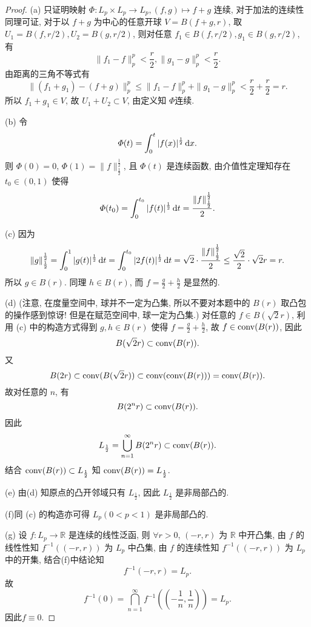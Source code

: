 \begin{proof}
    (a) 只证明映射 $\varPhi:L_p\times L_p\to L_p,(f,g)\mapsto f+g$ 连续,
    对于加法的连续性同理可证, 对于以 $f+g$ 为中心的任意开球 $V=B(f+g,r)$,
    取 $U_1=B(f,r/2),U_2=B(g,r/2)$, 则对任意 $f_1\in B(f,r/2),g_1\in B(g,r/2)$, 有
    \[\|f_1-f\|_p^p<\frac{r}{2},\|g_1-g\|_p^p<\frac{r}{2}.\]
    由距离的三角不等式有
    \[\|(f_1+g_1)-(f+g)\|_p^p\leq\|f_1-f\|_p^p+\|g_1-g\|_p^p<\frac{r}{2}+\frac{r}{2}=r.\]
    所以 $f_1+g_1\in V$, 故 $U_1+U_2\subset V$, 由定义知 $\varPhi$连续.

    (b) 令
    \[\varPhi(t)=\int_0^t|f(x)|^{\frac{1}{2}}\mathop{}\!\mathrm{d} x.\]
    则 $\varPhi(0)=0$, $\varPhi(1)=\|f\|_{\frac{1}{2}}^{\frac{1}{2}}$,
    且 $\varPhi(t)$ 是连续函数, 由介值性定理知存在 $t_0\in(0,1)$ 使得
    \[\varPhi(t_0)=\int_0^{t_0}|f(t)|^{\frac{1}{2}}\mathop{}\!\mathrm{d} t=\frac{\|f\|_{\frac{1}{2}}^{\frac{1}{2}}}{2}.\]

    (c) 因为
    \[\|g\|_{\frac{1}{2}}^{\frac{1}{2}}=\int_0^1|g(t)|^{\frac{1}{2}}\mathop{}\!\mathrm{d} t=\int_0^{t_0}|2f(t)|^{\frac{1}{2}}\mathop{}\!\mathrm{d} t=\sqrt{2}\cdot\frac{\|f\|_{\frac{1}{2}}^{\frac{1}{2}}}{2}\leq\frac{\sqrt{2}}{2}\cdot\sqrt{2}r=r.\]
    所以 $g\in B(r)$. 同理 $h\in B(r)$, 而 $f=\frac{g}{2}+\frac{h}{2}$ 是显然的.

    (d) (注意, 在度量空间中, 球并不一定为凸集, 所以不要对本题中的 $B(r)$ 取凸包的操作感到惊讶! 但是在赋范空间中, 球一定为凸集.)
    对任意的 $f\in B(\sqrt{2}r)$, 利用 (c) 中的构造方式得到 $g,h\in B(r)$ 使得 $f=\frac{g}{2}+\frac{h}{2}$,
    故 $f\in \operatorname{conv}(B(r))$, 因此
    \[B(\sqrt{2}r)\subset \operatorname{conv}(B(r)).\]
    又
    \[B(2r)\subset \operatorname{conv}(B(\sqrt{2}r))\subset \operatorname{conv}(\operatorname{conv}(B(r)))=\operatorname{conv}(B(r)).\]
    故对任意的 $n$, 有
    \[B(2^nr)\subset \operatorname{conv}(B(r)).\]
    因此
    \[L_{\frac{1}{2}}=\bigcup_{n=1}^{\infty} B(2^nr)\subset \operatorname{conv}(B(r)).\]
    结合 $\operatorname{conv}(B(r))\subset L_{\frac{1}{2}}$ 知 $\operatorname{conv}(B(r))=L_{\frac{1}{2}}$.

    (e) 由(d) 知原点的凸开邻域只有 $L_{\frac{1}{2}}$, 因此 $L_{\frac{1}{2}}$ 是非局部凸的.

    (f)同 (c) 的构造亦可得 $L_p(0<p<1)$ 是非局部凸的.

    (g) 设 $f:L_p\to\mathbb{R}$ 是连续的线性泛函,
    则 $\forall r>0$, $(-r,r)$ 为 $\mathbb{R}$ 中开凸集,
    由 $f$ 的线性性知 $f^{-1}((-r,r))$ 为 $L_p$ 中凸集, 
    由 $f$ 的连续性知 $f^{-1}((-r,r))$ 为 $L_p$ 中的开集, 结合(f)中结论知
    \[f^{-1}(-r,r)=L_p.\]
    故
    \[f^{-1}(0)=\bigcap_{n=1}^{\infty}f^{-1}\left(\left(-\frac{1}{n},\frac{1}{n}\right)\right)=L_p.\]
    因此$f\equiv 0$.
\end{proof}